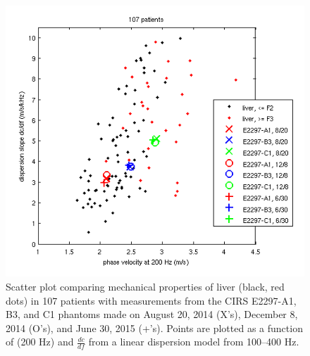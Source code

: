 \begin{figure}[htb!]
    \centering
    \includegraphics[width=0.75\linewidth]{phantom_liver_scatter_plot.png}
    \caption{Scatter plot comparing mechanical properties of liver (black, red
        dots) in 107 patients with measurements from the CIRS E2297-A1, B3, and
        C1 phantoms made on August 20, 2014 (X’s), December 8, 2014 (O’s), and
        June 30, 2015 (+’s). Points are plotted as a function of (200 Hz) and
        $\frac{dc}{df}$ from a linear dispersion model from 100--400 Hz.}
\label{fig:phantom_liver_scatter_plot}
\end{figure}
